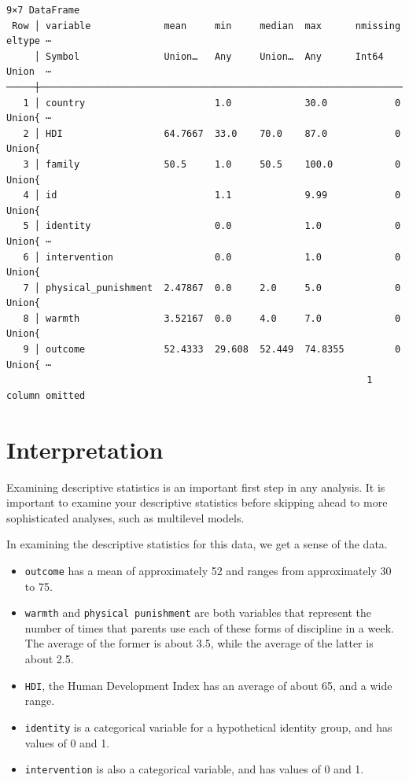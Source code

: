 \documentclass[
  letterpaper,
  DIV=11,
  numbers=noendperiod]{scrreprt}
\providecommand{\tightlist}{%
  \setlength{\itemsep}{0pt}\setlength{\parskip}{0pt}}\usepackage{longtable,booktabs,array}
\begin{document}
\begin{verbatim}
9×7 DataFrame
 Row │ variable             mean     min     median  max      nmissing  eltype ⋯
     │ Symbol               Union…   Any     Union…  Any      Int64     Union  ⋯
─────┼──────────────────────────────────────────────────────────────────────────
   1 │ country                       1.0             30.0            0  Union{ ⋯
   2 │ HDI                  64.7667  33.0    70.0    87.0            0  Union{
   3 │ family               50.5     1.0     50.5    100.0           0  Union{
   4 │ id                            1.1             9.99            0  Union{
   5 │ identity                      0.0             1.0             0  Union{ ⋯
   6 │ intervention                  0.0             1.0             0  Union{
   7 │ physical_punishment  2.47867  0.0     2.0     5.0             0  Union{
   8 │ warmth               3.52167  0.0     4.0     7.0             0  Union{
   9 │ outcome              52.4333  29.608  52.449  74.8355         0  Union{ ⋯
                                                                1 column omitted
\end{verbatim}

\section{Interpretation}\label{interpretation}

Examining descriptive statistics is an important first step in any
analysis. It is important to examine your descriptive statistics before
skipping ahead to more sophisticated analyses, such as multilevel
models.

In examining the descriptive statistics for this data, we get a sense of
the data.

\begin{itemize}
\tightlist
\item
  \texttt{outcome} has a mean of approximately 52 and ranges from
  approximately 30 to 75.
\item
  \texttt{warmth} and \texttt{physical\ punishment} are both variables
  that represent the number of times that parents use each of these
  forms of discipline in a week. The average of the former is about 3.5,
  while the average of the latter is about 2.5.
\item
  \texttt{HDI}, the Human Development Index has an average of about 65,
  and a wide range.
\item
  \texttt{identity} is a categorical variable for a hypothetical
  identity group, and has values of 0 and 1.
\item
  \texttt{intervention} is also a categorical variable, and has values
  of 0 and 1.
\end{itemize}
\end{document}

